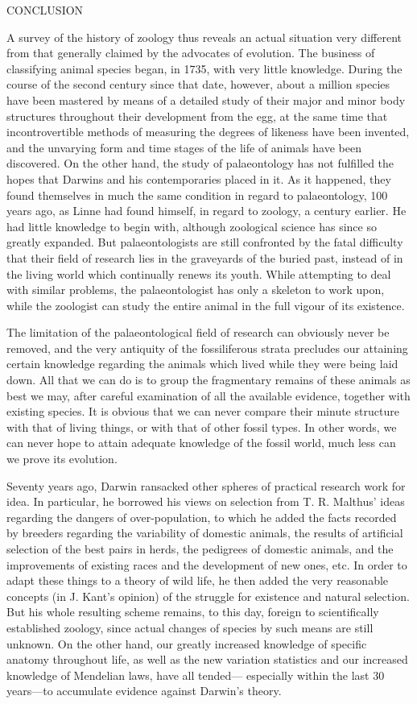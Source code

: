 CONCLUSION

A survey of the history of zoology thus reveals an actual situation very different from that
generally claimed by the advocates of evolution. The business of classifying animal species
began, in 1735, with very little knowledge. During the course of the second century since that
date, however, about a million species have been mastered by means of a detailed study of
their major and minor body structures throughout their development from the egg, at the
same time that incontrovertible methods of measuring the degrees of likeness have been
invented, and the unvarying form and time stages of the life of animals have been discovered.
On the other hand, the study of palaeontology has not fulfilled the hopes that Darwins and his
contemporaries placed in it. As it happened, they found themselves in much the same
condition in regard to palaeontology, 100 years ago, as Linne had found himself, in regard to
zoology, a century earlier. He had little knowledge to begin with, although zoological science
has since so greatly expanded. But palaeontologists are still confronted by the fatal difficulty
that their field of research lies in the graveyards of the buried past, instead of in the living
world which continually renews its youth. While attempting to deal with similar problems,
the palaeontologist has only a skeleton to work upon, while the zoologist can study the entire
animal in the full vigour of its existence.

The limitation of the palaeontological field of research can obviously never be removed, and
the very antiquity of the fossiliferous strata precludes our attaining certain knowledge
regarding the animals which lived while they were being laid down. All that we can do is to
group the fragmentary remains of these animals as best we may, after careful examination of
all the available evidence, together with existing species. It is obvious that we can never
compare their minute structure with that of living things, or with that of other fossil types. In
other words, we can never hope to attain adequate knowledge of the fossil world, much less
can we prove its evolution.

Seventy years ago, Darwin ransacked other spheres of practical research work for idea. In
particular, he borrowed his views on selection from T. R. Malthus' ideas regarding the
dangers of over-population, to which he added the facts recorded by breeders regarding the
variability of domestic animals, the results of artificial selection of the best pairs in herds, the
pedigrees of domestic animals, and the improvements of existing races and the development
of new ones, etc. In order to adapt these things to a theory of wild life, he then added the very
reasonable concepts (in J. Kant's opinion) of the struggle for existence and natural selection.
But his whole resulting scheme remains, to this day, foreign to scientifically established
zoology, since actual changes of species by such means are still unknown. On the other hand,
our greatly increased knowledge of specific anatomy throughout life, as well as the new
variation statistics and our increased knowledge of Mendelian laws, have all tended—
especially within the last 30 years—to accumulate evidence against Darwin's theory.

